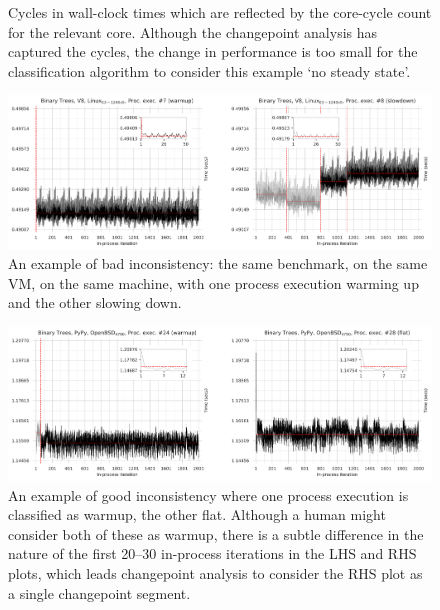 \documentclass[acmsmall,screen]{acmart}
\begin{document}
\begin{figure}[t]
\begin{minipage}[t]{0.485\textwidth}
\caption{Cycles in wall-clock times which are reflected by the core-cycle count
for the relevant core. Although the changepoint analysis has captured the
cycles, the change in performance is too small for the classification algorithm
to consider this example `no steady state'.}
\label{fig:examples:cycles}
\end{minipage}
\end{figure}

\begin{figure}[t!]
\centering
\includegraphics[width=\textwidth]{examples/new_inconsistent.pdf}
\caption{An example of bad inconsistency: the same benchmark, on
the same VM, on the same machine, with one process execution warming
up and the other slowing down.}
\label{fig:examples:inconsistent}
\vspace{-.4cm}
\end{figure}

\begin{figure}[t]
\centering%
\includegraphics[width=\textwidth]{examples/warmup_flat.pdf}
\caption{An example of good inconsistency where one process execution
is classified as warmup, the other flat. Although a human might consider
both of these as warmup, there is a subtle difference in the nature of the first 20--30
in-process iterations in the LHS and RHS plots, which leads changepoint
analysis to consider the RHS plot as a single changepoint segment.}
\label{fig:examples:warmup_flat}
\vspace{-.4cm}
\end{figure}
\end{document}
